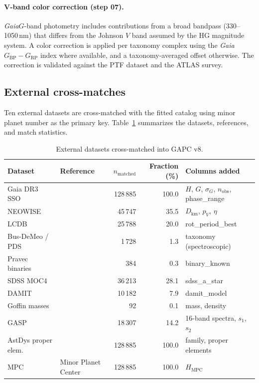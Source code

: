 \documentclass{aa}
\newcommand{\gapc}{GAPC\xspace}
\newcommand{\gaia}{{\it Gaia}\xspace}
\begin{document}
\paragraph{V-band color correction (step 07).}
\gaia $G$-band photometry includes contributions from a broad bandpass
(330–1050\,nm) that differs from the Johnson $V$ band assumed by the HG
magnitude system.  A color correction is applied per taxonomy complex
using the \gaia $G_\mathrm{BP} - G_\mathrm{RP}$ index where available, and
a taxonomy-averaged offset otherwise.  The correction is validated against
the PTF dataset \citep{waszczak2015} and the ATLAS survey.

\subsection{External cross-matches}
\label{sec:crossmatch}

Ten external datasets are cross-matched with the fitted catalog using
minor planet number as the primary key.  Table~\ref{tab:crossmatch}
summarizes the datasets, references, and match statistics.

\begin{table}
\centering
\caption{External datasets cross-matched into \gapc v8.}
\label{tab:crossmatch}
\begin{tabular}{llrrl}
\toprule
Dataset & Reference & $n_\mathrm{matched}$ & Fraction (\%) & Columns added \\
\midrule
Gaia DR3 SSO        & \citet{tanga2023}   & 128\,885 & 100.0 & $H$, $G$, $\sigma_G$, $n_\mathrm{obs}$, phase\_range \\
NEOWISE             & \citet{masiero2017}     &  45\,747 &  35.5 & $D_\mathrm{km}$, $p_V$, $\eta$ \\
LCDB                & \citet{warner2009}      &  25\,788 &  20.0 & rot\_period\_best \\
Bus-DeMeo / PDS     & \citet{demeo2009}       &   1\,728 &   1.3 & taxonomy (spectroscopic) \\
Pravec binaries     & \citet{pravec2007}      &     384  &   0.3 & binary\_known \\
SDSS MOC4           & \citet{ivezic2001}      &  36\,213 &  28.1 & sdss\_a\_star \\
DAMIT               & \citet{durech2010}      &  10\,182 &   7.9 & damit\_model \\
Goffin masses       & \citet{goffin2014}      &      92  &   0.1 & mass, density \\
GASP                & \citet{scheibenpflug2026} & 18\,307 & 14.2 & 16-band spectra, $s_1$, $s_2$ \\
AstDys proper elem. & \citet{knezevic2003}    & 128\,885 & 100.0 & family, proper elements \\
MPC                 & Minor Planet Center     & 128\,885 & 100.0 & $H_\mathrm{MPC}$ \\
\bottomrule
\end{tabular}
\end{table}
\end{document}
